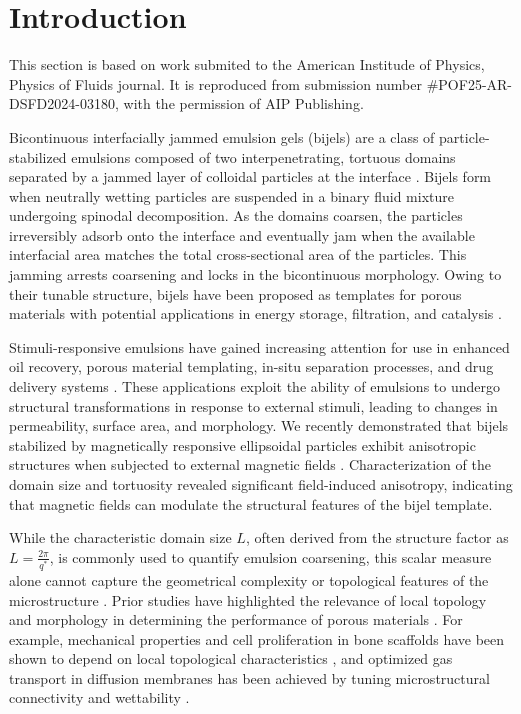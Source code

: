 \section{Introduction}

This section is based on work submited to the American Institude of Physics, Physics of Fluids journal.
It is reproduced from submission number \#POF25-AR-DSFD2024-03180, with the permission of AIP Publishing.

Bicontinuous interfacially jammed emulsion gels (bijels) are a class of particle-stabilized emulsions composed of two interpenetrating, tortuous domains separated by a jammed layer of colloidal particles 
at the interface \cite{stratford_colloidal_2005, herzig_bicontinuous_2007, tavacoli_novel_2011}. Bijels form when neutrally wetting particles are suspended in a binary fluid mixture undergoing spinodal 
decomposition. As the domains coarsen, the particles irreversibly adsorb onto the interface and eventually jam when the available interfacial area matches the total cross-sectional area of the particles. 
This jamming arrests coarsening and locks in the bicontinuous morphology. Owing to their tunable structure, bijels have been proposed as templates for porous materials with potential applications in 
energy storage, filtration, and catalysis \cite{yabuno_preparation_2020, samdani_bicontinuous_2017, cha_bicontinuous_2019, garcia_scalable_2019, santiago_cordoba_aerobijels_2020}.

Stimuli-responsive emulsions have gained increasing attention for use in enhanced oil recovery, porous material templating, in-situ separation processes, and drug delivery systems 
\cite{tang_stimuli-responsive_2016, bago_rodriguez_capsules_2019, nakayama_stimuli-responsive_2018}. These applications exploit the ability of emulsions to undergo structural transformations in response 
to external stimuli, leading to changes in permeability, surface area, and morphology. We recently demonstrated that bijels stabilized by magnetically responsive ellipsoidal particles exhibit anisotropic 
structures when subjected to external magnetic fields \cite{karthikeyan_formation_2024}. Characterization of the domain size and tortuosity revealed significant field-induced anisotropy, indicating that 
magnetic fields can modulate the structural features of the bijel template.

While the characteristic domain size \(L\), often derived from the structure factor as \(L = \frac{2\pi}{q^*}\), is commonly used to quantify emulsion coarsening, this scalar measure alone cannot capture the 
geometrical complexity or topological features of the microstructure \cite{kendon_inertial_2001}. Prior studies have highlighted the relevance of local topology and morphology in determining the performance of 
porous materials \cite{liu_influence_2021, xiong_porosity_2024, shojaei_minimal_2022}. For example, mechanical properties and cell proliferation in bone scaffolds have been shown to depend on local topological 
characteristics \cite{xiong_porosity_2024}, and optimized gas transport in diffusion membranes has been achieved by tuning microstructural connectivity and wettability \cite{shojaei_minimal_2022}. 

